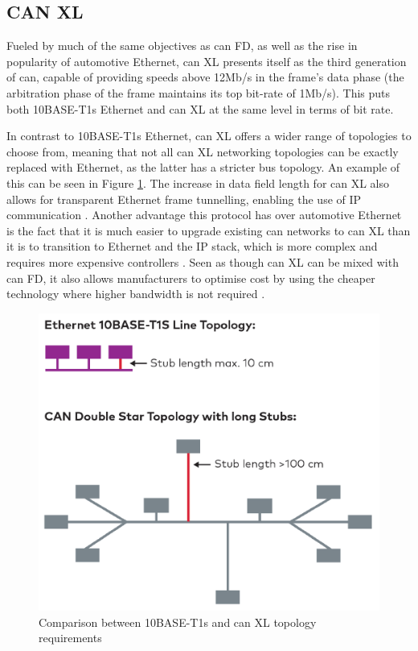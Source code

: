 \subsection{CAN XL}

Fueled by much of the same objectives as \gls{can} FD, as well as the rise in popularity of automotive Ethernet, \gls{can} XL presents itself as the third generation of \gls{can}, capable of providing speeds above 12Mb/s in the frame's data phase (the arbitration phase of the frame maintains its top bit-rate of 1Mb/s). This puts both 10BASE-T1s Ethernet and \gls{can} XL at the same level in terms of bit rate.\par

In contrast to 10BASE-T1s Ethernet, \gls{can} XL offers a wider range of topologies to choose from, meaning that not all \gls{can} XL networking topologies can be exactly replaced with Ethernet, as the latter has a stricter bus topology. An example of this can be seen in Figure \ref{fig:EthernetCANXL_Topologies}. The increase in data field length for \gls{can} XL also allows for transparent Ethernet frame tunnelling, enabling the use of IP communication \citep{BoschCANXL}. Another advantage this protocol has over automotive Ethernet is the fact that it is much easier to upgrade existing \gls{can} networks to \gls{can} XL than it is to transition to Ethernet and the IP stack, which is more complex and requires more expensive controllers \citep{VectorCANXL}. Seen as though \gls{can} XL can be mixed with \gls{can} FD, it also allows manufacturers to optimise cost by using the cheaper technology where higher bandwidth is not required \citep{BoschCANXL}.

\begin{figure}
    \centering
    \includegraphics[width = \textwidth]{img/parts/introduction/Ethernet and CAN XL Topologies.png}
    \caption{Comparison between 10BASE-T1s and \gls{can} XL topology requirements \citep{VectorCANXL}}
    \label{fig:EthernetCANXL_Topologies}
\end{figure}

